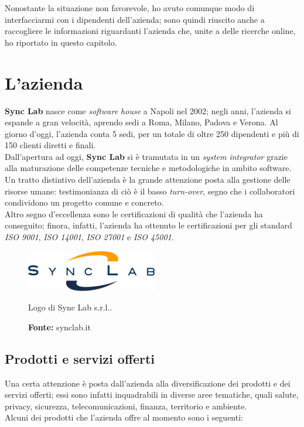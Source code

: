 Nonostante la situazione non favorevole, ho avuto comunque modo di interfacciarmi con i dipendenti dell'azienda; sono quindi riuscito anche a raccogliere le informazioni riguardanti l'azienda che, unite a delle ricerche online, ho riportato in questo capitolo.

\section{L'azienda}

\textbf{Sync Lab} nasce come \textit{software house} a Napoli nel 2002; negli anni, l'azienda si espande a gran velocità, aprendo sedi a Roma, Milano, Padova e Verona. Al giorno d'oggi, l'azienda conta 5 sedi, per un totale di oltre 250 dipendenti e più di 150 clienti diretti e finali. \\
Dall'apertura ad oggi, \textbf{Sync Lab} si è tramutata in un \textit{system integrator} grazie alla maturazione delle competenze tecniche e metodologiche in ambito software. Un tratto distintivo dell'azienda è la grande attenzione posta alla gestione delle risorse umane: testimonianza di ciò è il basso \textit{turn-over}, segno che i collaboratori condividono un progetto comune e concreto. \\
Altro segno d'eccellenza sono le certificazioni di qualità che l'azienda ha conseguito; finora, infatti, l'azienda ha ottenuto le certificazioni per gli standard \textit{ISO 9001}, \textit{ISO 14001}, \textit{ISO 27001} e \textit{ISO 45001}. \\

\begin{figure}[htbp]
  \begin{center}
    \includegraphics[height=1.8cm]{immagini/synclab-logo}
  \end{center}
  \caption{Logo di Sync Lab s.r.l..}
  \caption*{\textbf{Fonte:} synclab.it}
\end{figure}

\subsection*{Prodotti e servizi offerti}
Una certa attenzione è posta dall'azienda alla diversificazione dei prodotti e dei servizi offerti; essi sono infatti inquadrabili in diverse aree tematiche, quali salute, privacy, sicurezza, telecomunicazioni, finanza, territorio e ambiente. \\
Alcuni dei prodotti che l'azienda offre al momento sono i seguenti:

